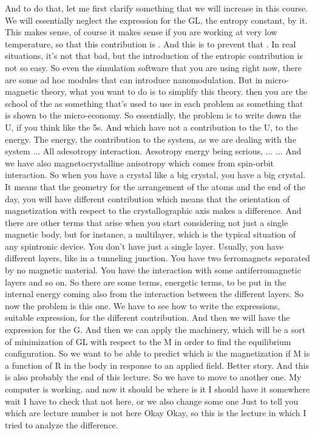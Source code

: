 And to do that, let me first clarify something that we will increase in this course. We will essentially neglect the expression for the GL, the entropy constant, by it. This makes sense, of course it makes sense if you are working at very low temperature, so that this contribution is . And this is to prevent that . In real situations, it's not that bad, but the introduction of the entropic contribution is not so easy. So even the simulation software that you are using right now, there are some ad hoc modules that can introduce nanomodulation. But in micro-magnetic theory, what you want to do is to simplify this theory. then you are the school of the as something that's used to use in each problem as something that is shown to the micro-economy. So essentially, the problem is to write down the U, if you think like the 5s. And which have not a contribution to the U, to the energy. The energy, the contribution to the system, as we are dealing with the system ... All adesotropy interaction. Aesotropy energy being serious, ... ... And we have also magnetocrystalline anisotropy which comes from spin-orbit interaction. So when you have a crystal like a big crystal, you have a big crystal. It means that the geometry for the arrangement of the atoms and the end of the day, you will have different contribution which means that the orientation of magnetization with respect to the crystallographic axis makes a difference. And there are other terms that arise when you start considering not just a single magnetic body, but for instance, a multilayer, which is the typical situation of any spintronic device. You don't have just a single layer. Usually, you have different layers, like in a tunneling junction. You have two ferromagnets separated by no magnetic material. You have the interaction with some antiferromagnetic layers and so on. So there are some terms, energetic terms, to be put in the internal energy coming also from the interaction between the different layers. So now the problem is this one. We have to see how to write the expressions, suitable expression, for the different contribution. And then we will have the expression for the G. And then we can apply the machinery, which will be a sort of minimization of GL with respect to the M in order to find the equilibrium configuration. So we want to be able to predict which is the magnetization if M is a function of R in the body in response to an applied field. Better story. And this is also probably the end of this lecture. So we have to move to another one. My computer is working. and now it should be where is it I should have it somewhere wait I have to check that not here, or we also change some one Just to tell you which are lecture number is not here Okay Okay, so this is the lecture in which I tried to analyze the difference.